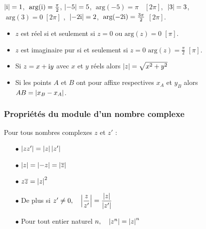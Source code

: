        
       \begin{example}
       $  \left\lvert \text{i} \right\rvert=1 $,  $ \;\text{arg}(\text{i}) =\frac{\pi}{2}$, $ \left\lvert -5 \right\rvert=5 $,  $ \;\text{arg}(-5) =\pi$ $\;\; [2\pi] $, $\;  \left\lvert 3 \right\rvert=3$, $ \;\text{arg}(3) =0\;  [2\pi] $ 
, $\;  \left\lvert -2\text{i} \right\rvert=2 $,  $\; \text{arg}(-2\text{i}) =\frac{3\pi}{2}$\: $[2\pi] $.
\end{example}

\begin{corollary}
     \begin{itemize}
\item $ z $  est réel si et seulement si  $ z=0 $ ou $ \text{arg}(z) =0$\: $[\pi] $.
\item $ z $  est imaginaire pur si et seulement si $ z=0 $  $ \text{arg}(z) =\frac{\pi}{2}$\: $[\pi] $.
\end{itemize}
  \end{corollary}
\begin{remark}
\begin{itemize}
\item Si $ z=x+\text{i} y $  avec $x $ et $y $ réels alors $ \left\lvert z \right\rvert=\sqrt{x^2+y^2} $
\item Si les points $A $ et $ B$ ont pour affixe respectives $ x_A$ et $y_B $ alors $ AB=\left\lvert x_B - x_A \right\rvert $.
\end{itemize}
\end{remark}
\subsubsection*{Propriétés du module d'un nombre complexe}
\begin{property}
Pour tous nombres complexes $z $ et $z' $ :

\medskip

\begin{itemize}
\item[$  \bullet$]  $ \left\lvert zz' \right\rvert =\left\lvert z \right\rvert\left\lvert z' \right\rvert$
 \item[$  \bullet$] $ \left\lvert z \right\rvert =\left\lvert -z \right\rvert =\left\lvert \overline{z} \right\rvert$ 
 \item[$  \bullet$]   $z\overline{z}=\left\lvert z \right\rvert^2$


\medskip

\item[$  \bullet$]  De plus si $ z'\neq 0,  \quad   \left\lvert  \dfrac{z}{z'}  \right\rvert= \dfrac{\left\lvert z \right\rvert}{\left\lvert z' \right\rvert}$

\medskip
 \item[$  \bullet$] Pour tout entier naturel $ n, \quad  \left\lvert z^n \right\rvert =\left\lvert z \right\rvert^n$
\end{itemize}

\end{property}


